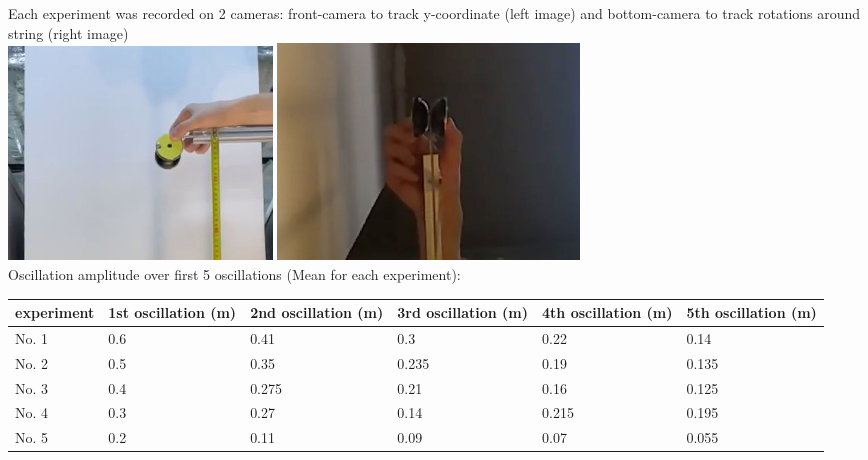 \documentclass[a4paper,11pt,oneside,article]{memoir}
\begin{document}
Each experiment was recorded on 2 cameras: front-camera to track y-coordinate (left image) and bottom-camera to track rotations around string (right image)\\
\includegraphics[width=7cm]{images/pic1.jpeg}
\includegraphics[width=8cm]{images/pic2.jpeg}\\

Oscillation amplitude over first 5 oscillations (Mean for each experiment):\\
\begin{center}
\begin{tabular}{ | m{5em} | m{2cm}| m{2cm} | m{2cm} |m{2cm} |m{2cm} |} 
  \hline
   experiment& 1st oscillation (m) & 2nd oscillation (m) & 3rd oscillation (m)& 4th oscillation (m)& 5th oscillation (m) \\ 
  \hline
   No. 1 & 0.6 & 0.41 & 0.3 & 0.22 & 0.14\\ 
  \hline
  No. 2 & 0.5 & 0.35 & 0.235 & 0.19 & 0.135\\ 
  \hline
  No. 3 & 0.4 & 0.275 & 0.21 & 0.16 & 0.125\\ 
  \hline
  No. 4 & 0.3 & 0.27 & 0.14 & 0.215 & 0.195\\ 
  \hline
  No. 5 & 0.2 & 0.11 & 0.09 & 0.07 & 0.055\\ 
  \hline
\end{tabular}
\end{center}
\end{document}
